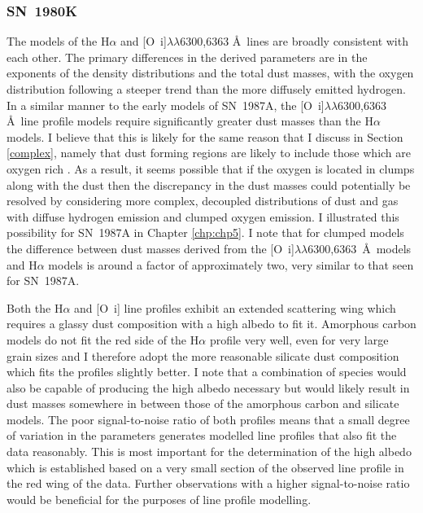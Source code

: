\subsubsection{SN~1980K}
The models of the H$\alpha$ and [O~{\sc i}]$\lambda\lambda$6300,6363 \AA\ lines are broadly consistent with each other.  The primary differences in the derived parameters are in the exponents of the density distributions and the total dust masses, with the oxygen distribution following a steeper trend than the more diffusely emitted hydrogen.  In a similar manner to the early models of SN~1987A, the [O~{\sc i}]$\lambda\lambda$6300,6363 \AA\ line profile models require significantly greater dust masses than the H$\alpha$ models. I believe that this is likely for the same reason that I discuss in Section \ref{complex}, namely that dust forming regions are likely to include those which are oxygen rich \citep{Kozma1998a}.  As a result, it seems possible that if the oxygen is  located in clumps along with the dust then the discrepancy in the dust masses could potentially be resolved by considering more complex, decoupled distributions of dust and gas with diffuse hydrogen emission and clumped oxygen emission.  I illustrated this possibility for SN~1987A in Chapter \ref{chp:chp5}.  I note that for clumped models the difference between dust masses derived from the [O~{\sc i}]$\lambda\lambda$6300,6363~\AA\ models and H$\alpha$ models is around a factor of approximately two, very similar to that seen for SN~1987A.  

Both the H$\alpha$ and [O~{\sc i}] line profiles exhibit an extended scattering wing which requires a glassy dust composition with a high albedo to fit it.  Amorphous carbon models do not fit the red side of the H$\alpha$ profile very well, even for very large grain sizes and I therefore adopt the more reasonable silicate dust composition which fits the profiles slightly better.  I note that a combination of species would also be capable of producing the high albedo necessary but would likely result in dust masses somewhere in between those of the amorphous carbon and silicate models.  The poor signal-to-noise ratio of both profiles means that a small degree of variation in the parameters generates modelled line profiles that also fit the data reasonably.  This is most important for the determination of the high albedo which is established based on a very small section of the observed line profile in the red wing of the data.  Further observations with a higher signal-to-noise ratio would be beneficial for the purposes of line profile modelling. 


